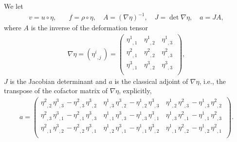 \documentclass[12pt,twoside,reqno]{amsart}
\numberwithin{equation}{section}
\theoremstyle{definition}
\theoremstyle{remark}
\begin{document}
We let
\begin{align*}
  v=u\circ\eta, \quad &f=\rho\circ\eta,  \quad
  A=({\nabla} \eta)^{-1}, \quad J=\det {\nabla}\eta, \quad a=JA,
\end{align*}
where $A$ is the inverse of the deformation tensor
\begin{align*}
  {\nabla}\eta=({{{\eta^i}}_{,{j}}\,})=\begin{pmatrix}
                             {{{\eta^1}}_{,{1}}\,} & {{{\eta^1}}_{,{2}}\,} & {{{\eta^1}}_{,{3}}\,} \\
                             {{{\eta^2}}_{,{1}}\,} & {{{\eta^2}}_{,{2}}\,} & {{{\eta^2}}_{,{3}}\,} \\
                             {{{\eta^3}}_{,{1}}\,} & {{{\eta^3}}_{,{2}}\,} & {{{\eta^3}}_{,{3}}\,} \\
                           \end{pmatrix},
\end{align*}
$J$ is the Jacobian determinant and $a$ is the classical adjoint of ${\nabla}\eta$, i.e., the transpose of the cofactor matrix of ${\nabla}\eta$, explicitly,
\begin{align}\label{eq.a}
  a=\begin{pmatrix}
      {{{\eta^2}}_{,{2}}\,}{{{\eta^3}}_{,{3}}\,}-{{{\eta^2}}_{,{3}}\,}{{{\eta^3}}_{,{2}}\,} & {{{\eta^1}}_{,{3}}\,}{{{\eta^3}}_{,{2}}\,}-{{{\eta^1}}_{,{2}}\,}{{{\eta^3}}_{,{3}}\,} & {{{\eta^1}}_{,{2}}\,}{{{\eta^2}}_{,{3}}\,}-{{{\eta^1}}_{,{3}}\,}{{{\eta^2}}_{,{2}}\,} \\
      {{{\eta^2}}_{,{3}}\,}{{{\eta^3}}_{,{1}}\,}-{{{\eta^2}}_{,{1}}\,}{{{\eta^3}}_{,{3}}\,} & {{{\eta^1}}_{,{1}}\,}{{{\eta^3}}_{,{3}}\,}-{{{\eta^1}}_{,{3}}\,}{{{\eta^3}}_{,{1}}\,} & {{{\eta^1}}_{,{3}}\,}{{{\eta^2}}_{,{1}}\,}-{{{\eta^1}}_{,{1}}\,}{{{\eta^2}}_{,{3}}\,}\\
      {{{\eta^2}}_{,{1}}\,}{{{\eta^3}}_{,{2}}\,}-{{{\eta^2}}_{,{2}}\,}{{{\eta^3}}_{,{1}}\,} & {{{\eta^1}}_{,{2}}\,}{{{\eta^3}}_{,{1}}\,}-{{{\eta^1}}_{,{1}}\,}{{{\eta^3}}_{,{2}}\,} & {{{\eta^1}}_{,{1}}\,}{{{\eta^2}}_{,{2}}\,}-{{{\eta^1}}_{,{2}}\,}{{{\eta^2}}_{,{1}}\,} \\
    \end{pmatrix}.
\end{align}
\end{document}

